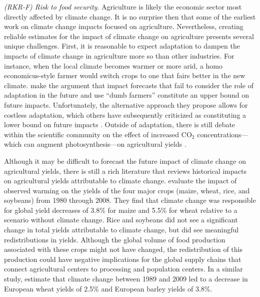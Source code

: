 \textit{(RKR-F) Risk to food security}. Agriculture is likely the economic sector most directly affected by climate change. It is no surprise then that some of the earliest work on climate change impacts focused on agriculture. 
Nevertheless, creating reliable estimates for the impact of climate change on agriculture presents several unique challenges. First, it is reasonable to expect adaptation to dampen the impacts of climate change in agriculture more so than other industries. For instance, when the local climate becomes warmer or more arid, a homo economicus-style farmer would switch crops to one that fairs better in the new climate. \cite{mendelsohn1994impact} make the argument that impact forecasts that fail to consider the role of adaptation in the future and use ``dumb farmers''  constitute an upper bound on future impacts. Unfortunately, the alternative approach they propose allows for costless adaptation, which others have subsequently criticized as constituting a lower bound on future impacts \citep{quiggin1999impact}. Outside of adaptation, there is still debate within the scientific community on the effect of increased CO$_2$ concentrations---which can augment photosynthesis---on agricultural yields \citep{long2006food, hatfield2011climate, myers2017climate}. 

Although it may be difficult to forecast the future impact of climate change on agricultural yields, there is still a rich literature that reviews historical impacts on agricultural yields attributable to climate change. \cite{lobell2011climate} evaluate the impact of observed warming on the yields of the four major crops (maize, wheat, rice, and soybeans) from 1980 through 2008. They find that climate change was responsible for global yield decreases of 3.8\% for maize and 5.5\% for wheat relative to a scenario without climate change. Rice and soybeans did not see a significant change in total yields attributable to climate change, but did see meaningful redistributions in yields. Although the global volume of food production associated with these crops might not have changed, the redistribution of this production could have negative implications for the global supply chains that connect agricultural centers to processing and population centers. In a similar study, \cite{moore2015fingerprint} estimate that climate change between 1989 and 2009 led to a decrease in European wheat yields of 2.5\% and European barley yields of 3.8\%.

